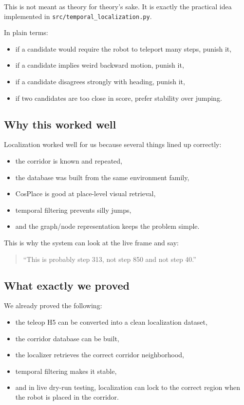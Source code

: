 \documentclass[11pt,a4paper]{article}
\begin{document}
This is not meant as theory for theory's sake.  It is exactly the practical
idea implemented in \texttt{src/temporal\_localization.py}.

In plain terms:

\begin{itemize}[nosep]
  \item if a candidate would require the robot to teleport many steps, punish it,
  \item if a candidate implies weird backward motion, punish it,
  \item if a candidate disagrees strongly with heading, punish it,
  \item if two candidates are too close in score, prefer stability over jumping.
\end{itemize}

\subsection{Why this worked well}

Localization worked well for us because several things lined up correctly:

\begin{itemize}[nosep]
  \item the corridor is known and repeated,
  \item the database was built from the same environment family,
  \item CosPlace is good at place-level visual retrieval,
  \item temporal filtering prevents silly jumps,
  \item and the graph/node representation keeps the problem simple.
\end{itemize}

This is why the system can look at the live frame and say:

\begin{quote}
``This is probably step 313, not step 850 and not step 40.''
\end{quote}

\subsection{What exactly we proved}

We already proved the following:

\begin{itemize}[nosep]
  \item the teleop H5 can be converted into a clean localization dataset,
  \item the corridor database can be built,
  \item the localizer retrieves the correct corridor neighborhood,
  \item temporal filtering makes it stable,
  \item and in live dry-run testing, localization can lock to the correct region
        when the robot is placed in the corridor.
\end{itemize}
\end{document}

